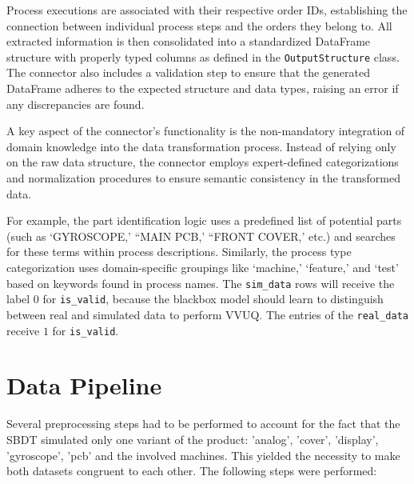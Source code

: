 Process executions are associated with their respective order IDs, establishing the connection between individual process steps and the orders they belong to. All extracted information is then consolidated into a standardized DataFrame structure with properly typed columns as defined in the \texttt{OutputStructure} class. The connector also includes a validation step to ensure that the generated DataFrame adheres to the expected structure and data types, raising an error if any discrepancies are found.

A key aspect of the connector's functionality is the non-mandatory integration of domain knowledge into the data transformation process. Instead of relying only on the raw data structure, the connector employs expert-defined categorizations and normalization procedures to ensure semantic consistency in the transformed data.

For example, the part identification logic uses a predefined list of potential parts (such as `GYROSCOPE,' ``MAIN PCB,' ``FRONT COVER,' etc.) and searches for these terms within process descriptions. Similarly, the process type categorization uses domain-specific groupings like `machine,' `feature,' and `test' based on keywords found in process names. The \texttt{sim\_data} rows will receive the label $0$ for \texttt{is\_valid}, because the blackbox model should learn to distinguish between real and simulated data to perform VVUQ. The entries of the \texttt{real\_data} receive $1$ for \texttt{is\_valid}.


\section{Data Pipeline}
\label{sec:data-pipeline}

Several preprocessing steps had to be performed to account for the fact that the SBDT simulated only one variant of the product: 'analog', 'cover', 'display', 'gyroscope', 'pcb' and the involved machines. This yielded the necessity to make both datasets congruent to each other. The following steps were performed:

